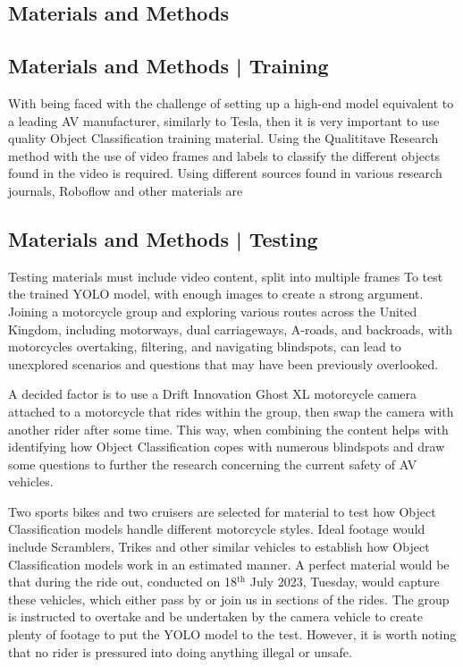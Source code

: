 \documentclass[a0,portrait]{a0poster}
\begin{document}
\begin{multicols}{2}
	\section*{Materials and Methods}
		\subsection*{Materials and Methods | Training}
			With being faced with the challenge of setting up a high-end model equivalent to a leading AV manufacturer, similarly to Tesla, then it is very important to use quality Object Classification training material. Using the Qualititave Research method with the use of video frames and labels to classify the different objects found in the video is required. Using different sources found in various research journals, Roboflow and other materials are 
		\subsection*{Materials and Methods | Testing}
			Testing materials must include video content, split into multiple frames To test the trained YOLO model, with enough images to create a strong argument. Joining a motorcycle group and exploring various routes across the United Kingdom, including motorways, dual carriageways, A-roads, and backroads, with motorcycles overtaking, filtering, and navigating blindspots, can lead to unexplored scenarios and questions that may have been previously overlooked.
				
			A decided factor is to use a Drift Innovation Ghost XL motorcycle camera attached to a motorcycle that rides within the group, then swap the camera with another rider after some time. This way, when combining the content helps with identifying how Object Classification copes with numerous blindspots and draw some questions to further the research concerning the current safety of AV vehicles. 
			
			Two sports bikes and two cruisers are selected for material to test how Object Classification models handle different motorcycle styles. Ideal footage would include Scramblers, Trikes and other similar vehicles to establish how Object Classification models work in an estimated manner. A perfect material would be that during the ride out, conducted on 18$^\text{th}$ July 2023, Tuesday, would capture these vehicles, which either pass by or join us in sections of the rides. The group is instructed to overtake and be undertaken by the camera vehicle to create plenty of footage to put the YOLO model to the test. However, it is worth noting that no rider is pressured into doing anything illegal or unsafe.


\end{multicols}
\end{document}
